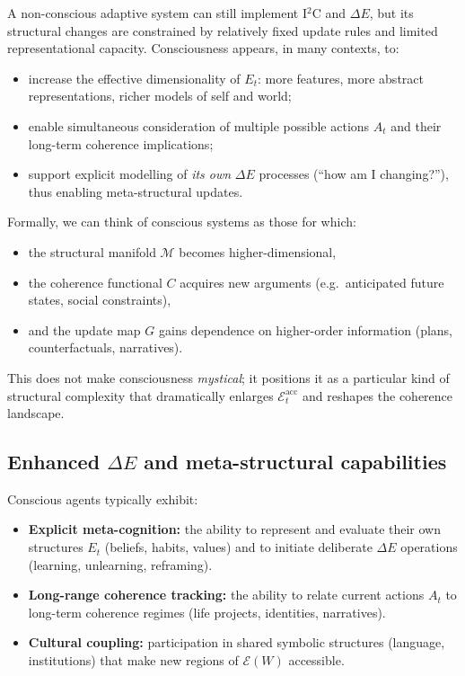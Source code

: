 \documentclass[12pt,a4paper]{report}
\newcommand{\Will}{W}
\begin{document}
A non-conscious adaptive system can still implement I$^2$C and $\Delta E$, but its structural changes are constrained by relatively fixed update rules and limited representational capacity. Consciousness appears, in many contexts, to:

\begin{itemize}[leftmargin=2em]
    \item increase the effective dimensionality of \(E_t\): more features, more abstract representations, richer models of self and world;
    \item enable simultaneous consideration of multiple possible actions \(A_t\) and their long-term coherence implications;
    \item support explicit modelling of \emph{its own} $\Delta E$ processes (``how am I changing?''), thus enabling meta-structural updates.
\end{itemize}

Formally, we can think of conscious systems as those for which:

\begin{itemize}[leftmargin=2em]
    \item the structural manifold \(\mathcal{M}\) becomes higher-dimensional,
    \item the coherence functional \(C\) acquires new arguments (e.g.\ anticipated future states, social constraints),
    \item and the update map \(G\) gains dependence on higher-order information (plans, counterfactuals, narratives).
\end{itemize}

This does not make consciousness \emph{mystical}; it positions it as a particular kind of structural complexity that dramatically enlarges \(\mathcal{E}_t^{\mathrm{acc}}\) and reshapes the coherence landscape.

\subsection*{Enhanced \texorpdfstring{$\Delta E$}{ΔE} and meta-structural capabilities}

Conscious agents typically exhibit:

\begin{itemize}[leftmargin=2em]
    \item \textbf{Explicit meta-cognition:} the ability to represent and evaluate their own structures \(E_t\) (beliefs, habits, values) and to initiate deliberate $\Delta E$ operations (learning, unlearning, reframing).
    \item \textbf{Long-range coherence tracking:} the ability to relate current actions \(A_t\) to long-term coherence regimes (life projects, identities, narratives).
    \item \textbf{Cultural coupling:} participation in shared symbolic structures (language, institutions) that make new regions of \(\mathcal{E}(\Will)\) accessible.
\end{itemize}
\end{document}
